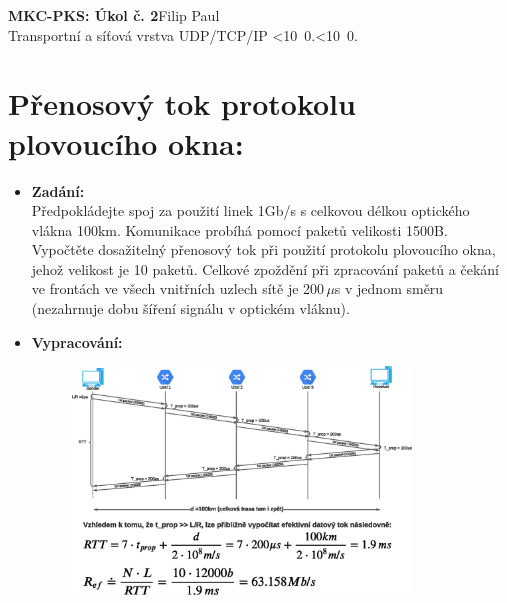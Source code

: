 \documentclass[10pt, a4paper]{article}%
\def\mydate{\leavevmode\hbox{\twodigits\day.\twodigits\month.\the\year}}
\def\twodigits#1{\ifnum#1<10 0\fi\the#1}
\begin{document}
\begin{flushleft}%
	\textbf{\Large{MKC-PKS: Úkol č. 2}}\hfill Filip Paul\\
	\large{Transportní a síťová vrstva UDP/TCP/IP \hfill\mydate}
\end{flushleft}
\section*{\large{\textbf{Přenosový tok protokolu plovoucího okna:}}}
	\begin{itemize}[label={}]
		\item \textbf{Zadání:}\\
		Předpokládejte spoj za použití linek 1Gb/s s celkovou délkou optického vlákna 100km. Komunikace
		probíhá pomocí paketů  velikosti 1500B. Vypočtěte dosažitelný přenosový tok při použití protokolu
		plovoucího okna, jehož velikost je 10 paketů.
		Celkové zpoždění při zpracování paketů a čekání ve frontách ve všech vnitřních uzlech sítě je 200\,$\mu$s v
		jednom směru (nezahrnuje dobu šíření signálu v optickém vláknu).\\

		\item \textbf{Vypracování:}\\
		\begin{figure}[ht!]
			\centering
			\includegraphics[width = 0.85\textwidth]{plov_okno.eps}
		\end{figure}
				
	\end{itemize}
\end{document}
